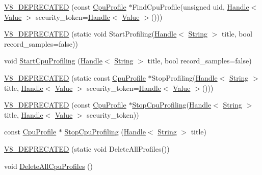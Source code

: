 \begin{DoxyCompactItemize}
\hyperlink{classv8_1_1_cpu_profiler_a2b83d2a89f2d59e8ab345d24dd0772ad}{V8\+\_\+\+D\+E\+P\+R\+E\+C\+A\+T\+E\+D} (const \hyperlink{classv8_1_1_cpu_profile}{Cpu\+Profile} $\ast$Find\+Cpu\+Profile(unsigned uid, \hyperlink{classv8_1_1_handle}{Handle}$<$ \hyperlink{classv8_1_1_value}{Value} $>$ security\+\_\+token=\hyperlink{classv8_1_1_handle}{Handle}$<$ \hyperlink{classv8_1_1_value}{Value} $>$()))
\item 
\hyperlink{classv8_1_1_cpu_profiler_ae42634ecdc9bf7b36be4a1c7ba4d182a}{V8\+\_\+\+D\+E\+P\+R\+E\+C\+A\+T\+E\+D} (static void Start\+Profiling(\hyperlink{classv8_1_1_handle}{Handle}$<$ \hyperlink{classv8_1_1_string}{String} $>$ title, bool record\+\_\+samples=false))
\item 
void \hyperlink{classv8_1_1_cpu_profiler_a61b2b49010708f0283c1613e2bdc1adc}{Start\+Cpu\+Profiling} (\hyperlink{classv8_1_1_handle}{Handle}$<$ \hyperlink{classv8_1_1_string}{String} $>$ title, bool record\+\_\+samples=false)
\item 
\hyperlink{classv8_1_1_cpu_profiler_ad568a967e5ef304b81d05ba3b32162e6}{V8\+\_\+\+D\+E\+P\+R\+E\+C\+A\+T\+E\+D} (static const \hyperlink{classv8_1_1_cpu_profile}{Cpu\+Profile} $\ast$Stop\+Profiling(\hyperlink{classv8_1_1_handle}{Handle}$<$ \hyperlink{classv8_1_1_string}{String} $>$ title, \hyperlink{classv8_1_1_handle}{Handle}$<$ \hyperlink{classv8_1_1_value}{Value} $>$ security\+\_\+token=\hyperlink{classv8_1_1_handle}{Handle}$<$ \hyperlink{classv8_1_1_value}{Value} $>$()))
\item 
\hyperlink{classv8_1_1_cpu_profiler_a5ea4bcc88636e9fa6353d97527ee8a25}{V8\+\_\+\+D\+E\+P\+R\+E\+C\+A\+T\+E\+D} (const \hyperlink{classv8_1_1_cpu_profile}{Cpu\+Profile} $\ast$\hyperlink{classv8_1_1_cpu_profiler_a531059626e708481ecb721a41a82a016}{Stop\+Cpu\+Profiling}(\hyperlink{classv8_1_1_handle}{Handle}$<$ \hyperlink{classv8_1_1_string}{String} $>$ title, \hyperlink{classv8_1_1_handle}{Handle}$<$ \hyperlink{classv8_1_1_value}{Value} $>$ security\+\_\+token))
\item 
const \hyperlink{classv8_1_1_cpu_profile}{Cpu\+Profile} $\ast$ \hyperlink{classv8_1_1_cpu_profiler_a531059626e708481ecb721a41a82a016}{Stop\+Cpu\+Profiling} (\hyperlink{classv8_1_1_handle}{Handle}$<$ \hyperlink{classv8_1_1_string}{String} $>$ title)
\item 
\hyperlink{classv8_1_1_cpu_profiler_afa2d595434f4a7d840aac528f25fa764}{V8\+\_\+\+D\+E\+P\+R\+E\+C\+A\+T\+E\+D} (static void Delete\+All\+Profiles())
\item 
void \hyperlink{classv8_1_1_cpu_profiler_a73bc2fff59e78276025772a8380dc2ab}{Delete\+All\+Cpu\+Profiles} ()
\end{DoxyCompactItemize}


